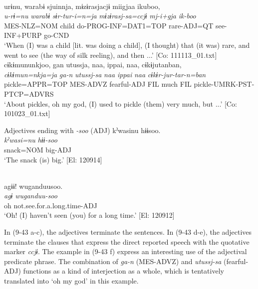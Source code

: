 \ex{}\\
    \glll  urɨnu,  warabɨ  sjuinnja,  mɨzɨrasjacjɨ  miigjaa  ikuboo,\\
      \textit{u-rɨ=nu}  \textit{warabɨ}  \textit{sɨr-tur-i=n=ja}  \textit{mɨzɨrasj-sa=ccjɨ}     \textit{mj-i+gja}  \textit{ik-boo}\\
      MES-NLZ=NOM  child  do-PROG-INF=DAT1=TOP  rare-ADJ=QT   see-INF+PURP  go-CND      \\
      \glt       ‘When (I) was a child [lit. was doing a child], (I thought) that (it was) rare, and went to see (the way of silk reeling), and then ...’ [Co: 111113\_01.txt]
\ex %
\glll      cɨkɨmununkjoo,  gan  utussja,  naa,  ippai,  naa,  cɨkɨjutanban,\\
      \textit{cɨkɨmun=nkja=ja}  \textit{ga-n}  \textit{utussj-sa}  \textit{naa}  \textit{ippai}  \textit{naa}  \textit{cɨkɨr-jur-tar-n=ban}\\
      pickle=APPR=TOP  MES-ADVZ  fearful-ADJ  FIL  much  FIL    pickle-UMRK-PST-PTCP=ADVRS\\
      \glt       ‘About pickles, oh my god, (I) used to pickle (them) very much, but ...’ [Co: 101023\_01.txt]

\exi{} Adjectives ending with \textit{{}-soo} (ADJ)
\ex %
\glll   kˀwasinu  hɨɨsoo.\\
      \textit{kˀwasi=nu}  \textit{hɨɨ-soo}\\
      snack=NOM  big-ADJ\\
      \glt       ‘The snack (is) big.’ [El: 120914]

\ex\relax [= (4-50 b)]\\
    \glll  agɨɨ!  wuganduusoo.\\
      \textit{agɨ}  \textit{wuganduu-soo}\\
      oh  not.see.for.a.long.time-ADJ\\
      \glt       ‘Oh! (I) haven’t seen (you) for a long time.’ [El: 120912]
    \z
\z

In (9-43 a-c), the adjectives terminate the sentences. In (9-43 d-e), the adjectives terminate the clauses that express the direct reported speech with the quotative marker \textit{ccjɨ}. The example in (9-43 f) express an interesting use of the adjectival predicate phrase. The combination of \textit{ga-n} (MES-ADVZ) and \textit{utussj-sa} (fearful-ADJ) functions as a kind of interjection as a whole, which is tentatively translated into ‘oh my god’ in this example.

